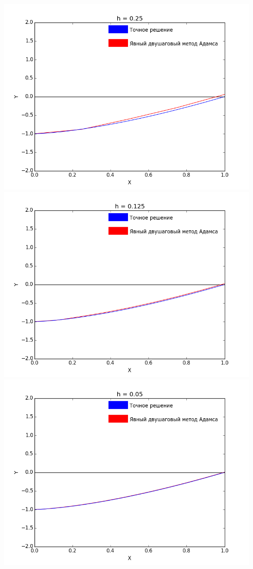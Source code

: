 \documentclass[12pt,a4paper]{article}
\begin{document}
        \includegraphics[scale=0.45]{adamsGraph_Step=0_25}\\
        \includegraphics[scale=0.45]{adamsGraph_Step=0_125}
        \includegraphics[scale=0.45]{adamsGraph_Step=0_05}
        
\end{document}

